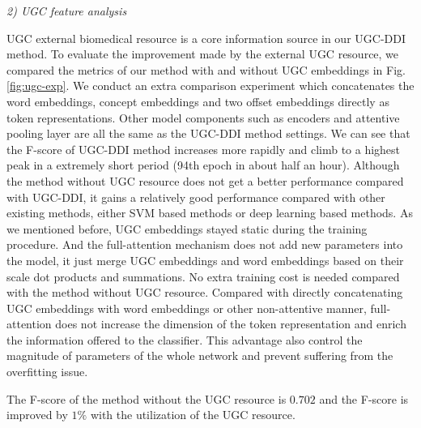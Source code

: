 \documentclass[conference]{IEEEtran}
\begin{document}
\bigbreak
\emph{2) UGC feature analysis}
\bigbreak

UGC external biomedical resource is a core information source in our UGC-DDI method.
To evaluate the improvement made by the external UGC resource, we compared the metrics of our method
with and without UGC embeddings in Fig. \ref{fig:ugc-exp}.
We conduct an extra comparison experiment which concatenates the word embeddings, concept embeddings and two offset embeddings directly as token representations.
Other model components such as encoders and attentive pooling layer are all the same as the UGC-DDI method settings.
We can see that the F-score of UGC-DDI method increases more rapidly and climb to a highest peak in a extremely short period (94th epoch in about half an hour).
Although the method without UGC resource does not get a better performance compared with UGC-DDI,
it gains a relatively good performance compared with other existing methods, either SVM based methods or deep learning based methods.
As we mentioned before, UGC embeddings stayed static during the training procedure.
And the full-attention mechanism does not add new parameters into the model, it just merge UGC embeddings and word embeddings based on their
scale dot products and summations.
No extra training cost is needed compared with the method without UGC resource.
Compared with directly concatenating UGC embeddings with word embeddings or other non-attentive manner,
full-attention does not increase the dimension of the token representation and enrich the information offered to the classifier.
This advantage also control the magnitude of parameters of the whole network and prevent suffering from the overfitting issue.

The F-score of the method without the UGC resource is $0.702$ and the F-score is improved by $1\%$ with the utilization of the UGC resource.

\end{document}
